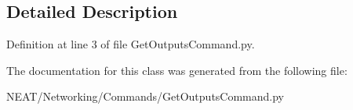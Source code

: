 \subsection{Detailed Description}


Definition at line 3 of file Get\+Outputs\+Command.\+py.



The documentation for this class was generated from the following file\+:\begin{DoxyCompactItemize}
\item 
N\+E\+A\+T/\+Networking/\+Commands/Get\+Outputs\+Command.\+py\end{DoxyCompactItemize}
